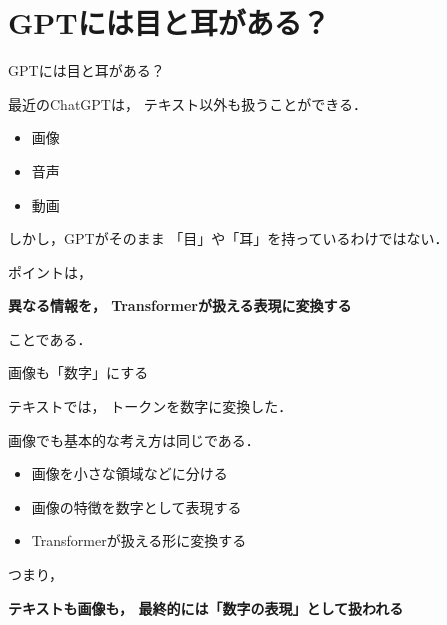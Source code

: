 \documentclass[aspectratio=169,professionalfonts]{beamer}
\begin{document}
\section{GPTには目と耳がある？}

\begin{frame}{GPTには目と耳がある？}

  最近のChatGPTは，
  テキスト以外も扱うことができる．

  \vspace{1em}

  \begin{itemize}
    \item 画像
    \item 音声
    \item 動画
  \end{itemize}

  \vspace{1em}

  しかし，GPTがそのまま
  「目」や「耳」を持っているわけではない．

  \vspace{1em}

  ポイントは，

  \begin{center}
    \textbf{異なる情報を，
    Transformerが扱える表現に変換する}
  \end{center}

  ことである．


\end{frame}


\begin{frame}{画像も「数字」にする}

  テキストでは，
  トークンを数字に変換した．

  \vspace{1em}

  画像でも基本的な考え方は同じである．

  \begin{itemize}
    \item 画像を小さな領域などに分ける
    \item 画像の特徴を数字として表現する
    \item Transformerが扱える形に変換する
  \end{itemize}

  \vspace{1em}

  つまり，

  \begin{center}
    \textbf{テキストも画像も，
    最終的には「数字の表現」として扱われる}
  \end{center}


\end{frame}
\end{document}
